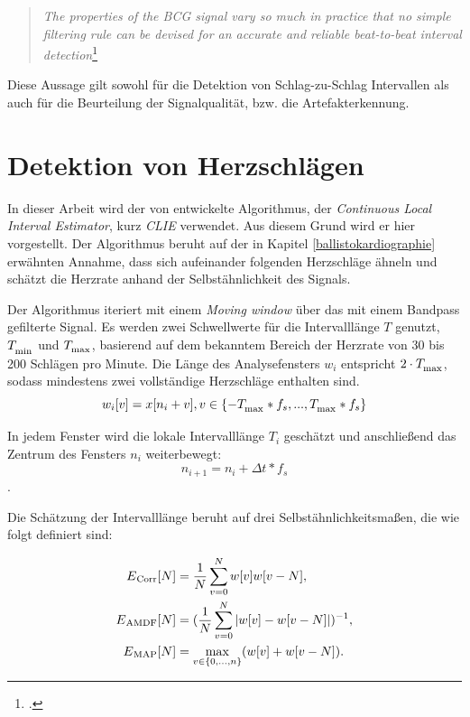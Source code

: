 	\begin{quote}\textit{The properties of the BCG signal vary so much in practice that no simple filtering rule can be devised for an accurate and reliable beat-to-beat interval detection}\footcite{Paalasmaa2015}\end{quote}
	
	Diese Aussage gilt sowohl für die Detektion von Schlag-zu-Schlag Intervallen als auch für die Beurteilung der Signalqualität, bzw. die Artefakterkennung.

\section{Detektion von Herzschlägen}\label{CLIE}

	In dieser Arbeit wird der von \citeauthor{Bruser2013} entwickelte Algorithmus, der \textit{Continuous Local Interval Estimator}, kurz \textit{CLIE} verwendet. Aus diesem Grund wird er hier vorgestellt. Der Algorithmus beruht auf der in Kapitel \ref{ballistokardiographie} erwähnten Annahme, dass sich aufeinander folgenden Herzschläge ähneln und schätzt die Herzrate anhand der Selbstähnlichkeit des Signals.


	Der Algorithmus iteriert mit einem \textit{Moving window} über das mit einem Bandpass gefilterte Signal. Es werden zwei Schwellwerte für die Intervalllänge $T$ genutzt, $T_\textsubscript{min}$ und $T_\textsubscript{max}$, basierend auf dem bekanntem Bereich der Herzrate von 30 bis 200 Schlägen pro Minute. Die Länge des Analysefensters $w_i$ entspricht $2 \cdot T_\textsubscript{max}$, sodass mindestens zwei vollständige Herzschläge enthalten sind.
	\[w_i[v] = x[n_i + v], v \in \{ -T_\textsubscript{max} * f_s, ..., T_\textsubscript{max} * f_s\}\]
	
	In jedem Fenster wird die lokale Intervalllänge $T_i$ geschätzt und anschließend das Zentrum des Fensters $n_i$ weiterbewegt: \[ n_{i+1} = n_i + \Delta t * f_s \].
	
	Die Schätzung der Intervalllänge beruht auf drei Selbstähnlichkeitsmaßen, die wie folgt definiert sind:
	
	\begin{align*}
		E\textsubscript{Corr}[N] &= \frac{1}{N} \sum_{v=0}^{N} w[v]w[v-N],\\
		E\textsubscript{AMDF}[N] &= (\frac{1}{N} \sum_{v=0}^{N} |w[v]-w[v-N]|)^{-1},\\
		E\textsubscript{MAP}[N] &= \max_{v \in \{0,...,n\}}(w[v]+w[v-N]).
	\end{align*}
 	
